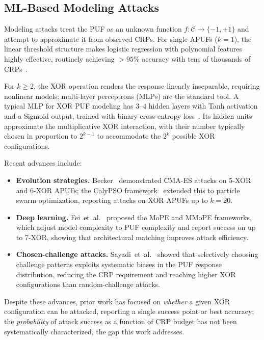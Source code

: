 \subsection{ML-Based Modeling Attacks}

Modeling attacks treat the PUF as an unknown function
$f: \mathcal{C} \to \{-1, +1\}$ and attempt to approximate it from observed
CRPs.  For single APUFs ($k=1$), the linear threshold structure makes
logistic regression with polynomial features highly effective, routinely
achieving $> 95\%$ accuracy with tens of thousands of
CRPs~\cite{ruhrmair2013}.

For $k \geq 2$, the XOR operation renders the response linearly inseparable,
requiring nonlinear models; multi-layer perceptrons (MLPs) are the standard
tool.  A typical MLP for XOR PUF modeling has 3--4 hidden layers with Tanh
activation and a Sigmoid output, trained with binary cross-entropy
loss~\cite{santikellur2023}.  Its hidden units approximate the multiplicative
XOR interaction, with their number typically chosen in proportion to $2^{k-1}$
to accommodate the $2^k$ possible XOR configurations.

Recent advances include:
\begin{itemize}
\item \textbf{Evolution strategies.} Becker~\cite{becker2015cia}
demonstrated CMA-ES attacks on 5-XOR and 6-XOR APUFs; the CalyPSO
framework~\cite{calypso2024} extended this to particle swarm optimization,
reporting attacks on XOR APUFs up to $k=20$.

\item \textbf{Deep learning.} Fei~et~al.~\cite{fei2024mope} proposed the
MoPE and MMoPE frameworks, which adjust model complexity to PUF complexity
and report success on up to 7-XOR, showing that architectural matching
improves attack efficiency.

\item \textbf{Chosen-challenge attacks.} Sayadi~et~al.~\cite{sayadi2025}
showed that selectively choosing challenge patterns exploits systematic biases
in the PUF response distribution, reducing the CRP requirement and reaching
higher XOR configurations than random-challenge attacks.
\end{itemize}

Despite these advances, prior work has focused on \emph{whether} a given XOR
configuration can be attacked, reporting a single success point or best
accuracy; the \emph{probability} of attack success as a function of CRP
budget has not been systematically characterized, the gap this work
addresses.

